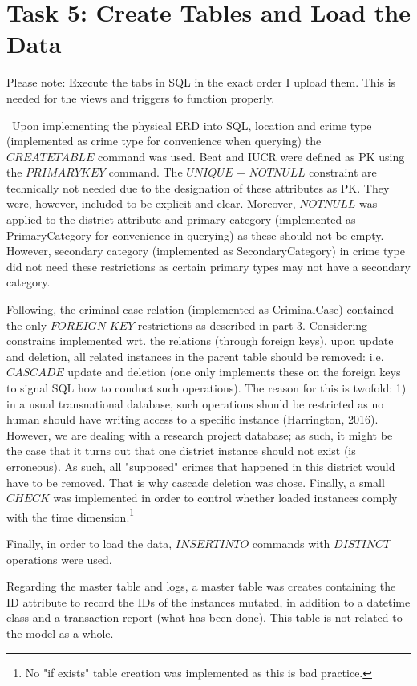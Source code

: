 \documentclass[a4paper]{article}
\begin{document}
\section{Task 5: Create Tables and Load the Data}

Please note: Execute the tabs in SQL in the exact order I upload them. This is needed for the views and triggers to function properly.

\
Upon implementing the physical ERD into SQL, location and crime type (implemented as crime type for convenience when querying) the $CREATE TABLE$ command was used. Beat and IUCR were defined as PK using the $PRIMARY KEY$ command. The $UNIQUE$ + $NOT NULL$ constraint are technically not needed due to the designation of these attributes as PK. They were, however, included to be explicit and clear. Moreover, $NOT NULL$ was applied to the district attribute and primary category (implemented as PrimaryCategory for convenience in querying) as these should not be empty. However, secondary category (implemented as SecondaryCategory) in crime type did not need these restrictions as certain primary types may not have a secondary category.

Following, the criminal case relation (implemented as CriminalCase) contained the only $FOREIGN$ $KEY$ restrictions as described in part 3. Considering constrains implemented wrt. the relations (through foreign keys), upon update and deletion, all related instances in the parent table should be removed: i.e. $CASCADE$ update and deletion (one only implements these on the foreign keys to signal SQL how to conduct such operations). The reason for this is twofold: 1) in a usual transnational database, such operations should be restricted as no human should have writing access to a specific instance (Harrington, 2016). However, we are dealing with a research project database; as such, it might be the case that it turns out that one district instance should not exist (is erroneous). As such, all "supposed" crimes that happened in this district would have to be removed. That is why cascade deletion was chose. Finally, a small $CHECK$ was implemented in order to control whether loaded instances comply with the time dimension.\footnote{No "if exists" table creation was implemented as this is bad practice.}

Finally, in order to load the data, $INSERT INTO$ commands with $DISTINCT$ operations were used. 

Regarding the master table and logs, a master table was creates containing the ID attribute to record the IDs of the instances mutated, in addition to a datetime class and a transaction report (what has been done). This table is not related to the model as a whole.
\end{document}
